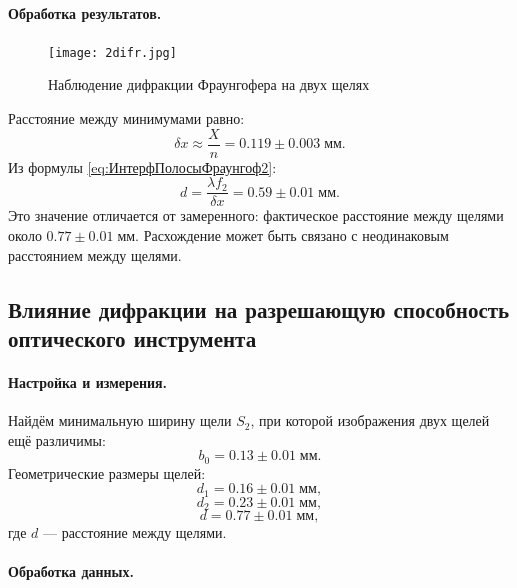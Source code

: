 \documentclass[a4paper, 12pt]{article}
\begin{document}
\paragraph{Обработка результатов.}

\begin{figure}[h!]
	\centering
	\texttt{[image: 2difr.jpg]}
	\caption{Наблюдение дифракции Фраунгофера на двух щелях}
	\label{fig:fraung2Dif}
\end{figure}

Расстояние между минимумами равно:
\begin{equation*}\label{key}
	\delta x \approx \frac{X}{n} = 0.119\pm 0.003 \; мм.
\end{equation*}
Из формулы \eqref{eq:ИнтерфПолосыФраунгоф2}:
\begin{equation*}\label{key}
	d = \frac{\lambda f_2}{\delta x} = 0.59\pm 0.01 \; мм.
\end{equation*}
Это значение отличается от замеренного: фактическое расстояние между щелями около $ 0.77\pm 0.01\; мм $. Расхождение может быть связано с неодинаковым расстоянием между щелями.

\subsection{Влияние дифракции на разрешающую способность оптического инструмента}

\paragraph{Настройка и измерения.}
Найдём минимальную ширину щели $ S_2 $, при которой изображения двух щелей ещё различимы:
\begin{equation*}\label{key}
	b_0 = 0.13\pm 0.01 \; мм.
\end{equation*}
Геометрические размеры щелей:
\begin{equation*}\label{key}
	d_1 = 0.16 \pm 0.01 \; мм,
\end{equation*}
\begin{equation*}\label{key}
	d_2 = 0.23 \pm 0.01 \; мм,
\end{equation*}
\begin{equation*}\label{key}
	d = 0.77 \pm 0.01 \; мм,
\end{equation*}
где $ d $ --- расстояние между щелями.

\paragraph{Обработка данных.}
\end{document}
